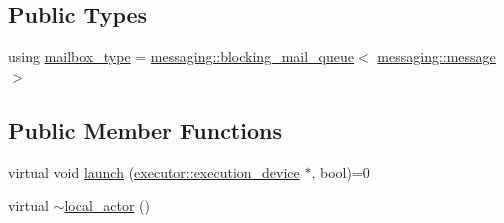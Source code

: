\subsection*{Public Types}
\begin{DoxyCompactItemize}
\item 
using \hyperlink{classactor__zeta_1_1actor_1_1local__actor_aacff3ec6e7196584dd640b8d57fa020e}{mailbox\+\_\+type} = \hyperlink{classactor__zeta_1_1messaging_1_1blocking__mail__queue}{messaging\+::blocking\+\_\+mail\+\_\+queue}$<$ \hyperlink{classactor__zeta_1_1messaging_1_1message}{messaging\+::message} $>$
\end{DoxyCompactItemize}
\subsection*{Public Member Functions}
\begin{DoxyCompactItemize}
\item 
virtual void \hyperlink{classactor__zeta_1_1actor_1_1local__actor_acfba412b813aee3250c589bee232f3cd}{launch} (\hyperlink{structactor__zeta_1_1executor_1_1execution__device}{executor\+::execution\+\_\+device} $\ast$, bool)=0
\item 
virtual \hyperlink{classactor__zeta_1_1actor_1_1local__actor_adb1c7cd995fef7b2c3199fa07df6dfca}{$\sim$local\+\_\+actor} ()
\end{DoxyCompactItemize}
